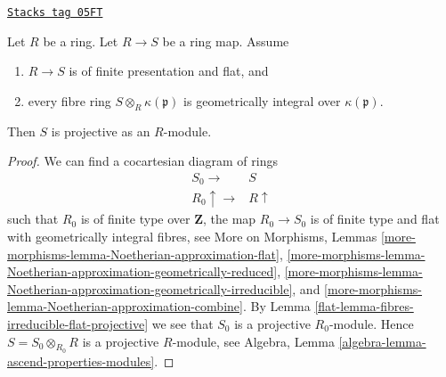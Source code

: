 \begin{lemma}
\label{flat-lemma-fibres-irreducible-flat-projective-nonnoetherian}
\href{https://stacks.math.columbia.edu/tag/05FT}{\texttt{Stacks tag 05FT}}

Let $R$ be a ring. Let $R \to S$ be a ring map.
Assume
\begin{enumerate}
\item $R \to S$ is of finite presentation and flat, and
\item every fibre ring $S \otimes_R \kappa(\mathfrak p)$ is
geometrically integral over $\kappa(\mathfrak p)$.
\end{enumerate}
Then $S$ is projective as an $R$-module.
\end{lemma}

\begin{proof}

We can find a cocartesian diagram of rings
$$
\begin{array}{cc}S_0 \longrightarrow & S \\ R_0 \uparrow\longrightarrow & R \uparrow\end{array}
$$
such that $R_0$ is of finite type over $\mathbf{Z}$, the map
$R_0 \to S_0$ is of finite type and flat with geometrically integral
fibres, see
More on Morphisms,
Lemmas \ref{more-morphisms-lemma-Noetherian-approximation-flat},
\ref{more-morphisms-lemma-Noetherian-approximation-geometrically-reduced},
\ref{more-morphisms-lemma-Noetherian-approximation-geometrically-irreducible},
and \ref{more-morphisms-lemma-Noetherian-approximation-combine}.
By
Lemma \ref{flat-lemma-fibres-irreducible-flat-projective}
we see that $S_0$ is a projective $R_0$-module. Hence $S = S_0 \otimes_{R_0} R$
is a projective $R$-module, see
Algebra, Lemma \ref{algebra-lemma-ascend-properties-modules}.
\end{proof}

